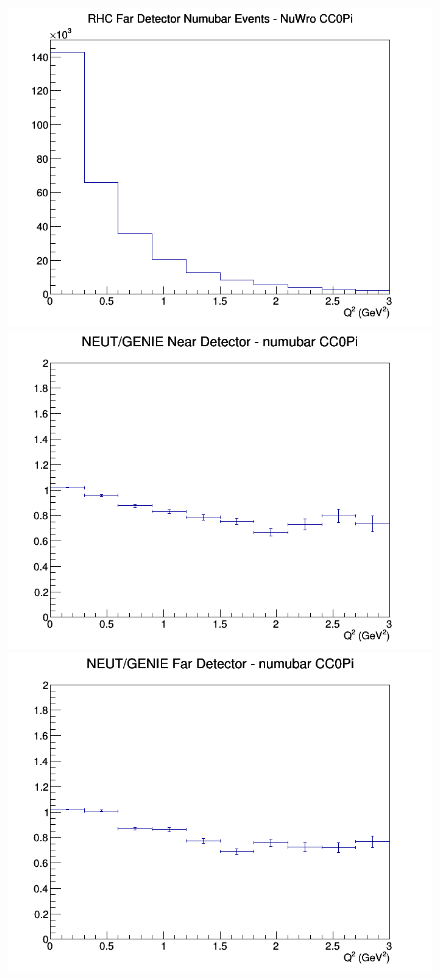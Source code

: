 \documentclass[12pt]{article}
\begin{document}
\begin{figure}[h]
\endminipage
{}
\includegraphics[width=\linewidth]{eff_Q2/GAr/CC0Pi_RHC_FD_numubar_Q2_NuWro.png}
\endminipage
\newline
{}
\includegraphics[width=\linewidth]{eff_Q2/GAr/ratios/CC0Pi_NEUT_GENIE_numubar_near_Q2.png}
\endminipage
{}
\includegraphics[width=\linewidth]{eff_Q2/GAr/ratios/CC0Pi_NEUT_GENIE_numubar_far_Q2.png}

\end{figure}
\end{document}
